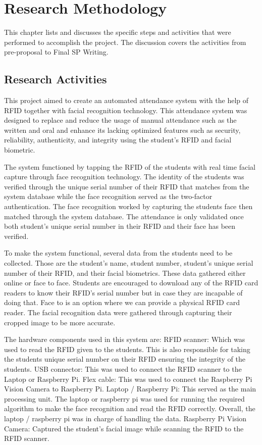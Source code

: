 \chapter{Research Methodology}
This chapter lists and discusses the specific steps and activities that were performed  to accomplish the project. 
The discussion covers the activities from pre-proposal to Final SP Writing.

\section{Research Activities}
This project aimed to create an automated attendance system with the help of RFID together with facial recognition technology. This attendance system was designed to replace and reduce the usage of manual attendance such as the written and oral and enhance its lacking optimized features such as security, reliability, authenticity, and integrity using the student’s RFID and facial biometric.

The system functioned by tapping the RFID of the students with real time facial capture through face recognition technology. The identity of the students was verified through the unique serial number of their RFID that matches from the system database while the face recognition served as the two-factor authentication. The face recognition worked by capturing the students face then matched through the system database. The attendance is only validated once both student’s unique serial number in their RFID and their face has been verified.

To make the system functional, several data from the students need to be collected. Those are the student’s name, student number, student’s unique serial number of  their RFID, and their facial biometrics. These data gathered either online or face to face. Students are encouraged to download any of the RFID card readers to know their RFID’s serial number but in case they are incapable of doing that. Face to is an option where we can provide a physical RFID card reader. The facial recognition data were gathered through capturing their cropped image to be more accurate. 

The hardware components used in this system are:
RFID scanner: Which was used to read the RFID given to the students. This is also responsible for taking the students unique serial number on their RFID ensuring the integrity of the students.
USB connector: This was used to connect the RFID scanner to the Laptop or Raspberry Pi. Flex cable: This was used to connect the Raspberry Pi Vision Camera to Raspberry Pi.
Laptop / Raspberry Pi: This served as the main processing unit. The laptop or raspberry pi was used for running the required algorithm to make the face recognition and read the RFID correctly. Overall, the laptop / raspberry pi was in charge of handling the data.
Raspberry Pi Vision Camera: Captured the student’s facial image while scanning the RFID to the RFID scanner. 

